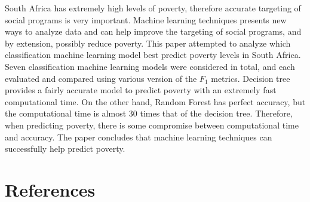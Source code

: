 \documentclass[11pt,preprint, authoryear]{elsarticle}
\numberwithin{equation}{section}
\numberwithin{figure}{section}
\numberwithin{table}{section}
\begin{document}
South Africa has extremely high levels of poverty, therefore accurate
targeting of social programs is very important. Machine learning
techniques presents new ways to analyze data and can help improve the
targeting of social programs, and by extension, possibly reduce poverty.
This paper attempted to analyze which classification machine learning
model best predict poverty levels in South Africa. Seven classification
machine learning models were considered in total, and each evaluated and
compared using various version of the \(F_1\) metrics. Decision tree
provides a fairly accurate model to predict poverty with an extremely
fast computational time. On the other hand, Random Forest has perfect
accuracy, but the computational time is almost 30 times that of the
decision tree. Therefore, when predicting poverty, there is some
compromise between computational time and accuracy. The paper concludes
that machine learning techniques can successfully help predict poverty.

\newpage

\hypertarget{references}{%
\section*{References}\label{references}}
\end{document}

